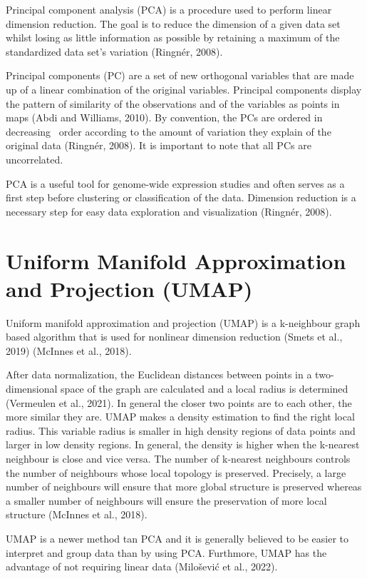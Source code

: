 \documentclass[
  parskip,
  oneside]{scrreprt}
\begin{document}
Principal component analysis (PCA) is a procedure used to perform linear
dimension reduction. The goal is to reduce the dimension of a given data
set whilst losing as little information as possible by retaining a
maximum of the standardized data set's variation (Ringnér, 2008).

Principal components (PC) are a set of new orthogonal variables that are
made up of a linear combination of the original variables. Principal
components display the pattern of similarity of the observations and of
the variables as points in maps (Abdi and Williams, 2010). By
convention, the PCs are ordered in decreasing ~order according to the
amount of variation they explain of the original data (Ringnér, 2008).
It is important to note that all PCs are uncorrelated.

PCA is a useful tool for genome-wide expression studies and often serves
as a first step before clustering or classification of the data.
Dimension reduction is a necessary step for easy data exploration and
visualization (Ringnér, 2008).

\hypertarget{uniform-manifold-approximation-and-projection-umap}{%
\section{Uniform Manifold Approximation and Projection
(UMAP)}\label{uniform-manifold-approximation-and-projection-umap}}

Uniform manifold approximation and projection (UMAP) is a k-neighbour
graph based algorithm that is used for nonlinear dimension reduction
(Smets et al., 2019) (McInnes et al., 2018).

After data normalization, the Euclidean distances between points in a
two-dimensional space of the graph are calculated and a local radius is
determined (Vermeulen et al., 2021). In general the closer two points
are to each other, the more similar they are. UMAP makes a density
estimation to find the right local radius. This variable radius is
smaller in high density regions of data points and larger in low density
regions. In general, the density is higher when the k-nearest neighbour
is close and vice versa. The number of k-nearest neighbours controls the
number of neighbours whose local topology is preserved. Precisely, a
large number of neighbours will ensure that more global structure is
preserved whereas a smaller number of neighbours will ensure the
preservation of more local structure (McInnes et al., 2018).

UMAP is a newer method tan PCA and it is generally believed to be easier
to interpret and group data than by using PCA. Furthmore, UMAP has the
advantage of not requiring linear data (Milošević et al., 2022).
\end{document}
